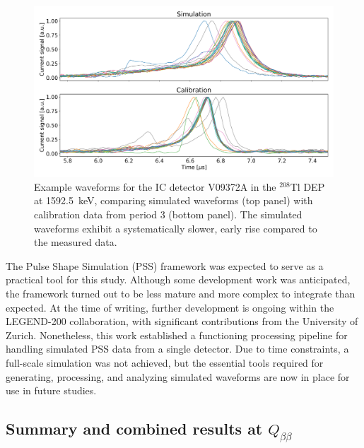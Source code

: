 \begin{figure}
\centering
\includegraphics[width=\linewidth]{figures/05_PSD/Plot_waveform_cal_vs_pss.png}
\caption{Example waveforms for the IC detector V09372A in the $^{208}$Tl DEP at 1592.5~keV, comparing simulated waveforms (top panel) with calibration data from period 3 (bottom panel). The simulated waveforms exhibit a systematically slower, early rise compared to the measured data. }
\label{fig:PSS_waveforms}
\end{figure}

The Pulse Shape Simulation (PSS) framework was expected to serve as a practical tool for this study. 
Although some development work was anticipated, the framework turned out to be less mature and more complex to integrate than expected. 
At the time of writing, further development is ongoing within the LEGEND-200 collaboration, with significant contributions from the University of Zurich.
Nonetheless, this work established a functioning processing pipeline for handling simulated PSS data from a single detector. 
Due to time constraints, a full-scale simulation was not achieved, but the essential tools required for generating, processing, and analyzing simulated waveforms are now in place for use in future studies. 




\subsection{Summary and combined results at \texorpdfstring{$Q_{\beta \beta}$}{}}

